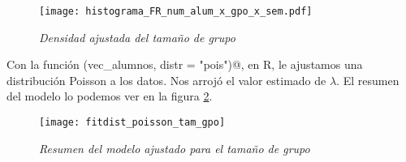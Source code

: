 \begin{figure}[H]
\centering
\texttt{[image: histograma\_FR\_num\_alum\_x\_gpo\_x\_sem.pdf]} %
\caption{\textit{Densidad ajustada del tamaño de grupo}}\label{densidad_tamGpo}
\end{figure}

Con la función \verb@fitdist(vec_alumnos, distr = "pois")@, en R, le ajustamos una distribución Poisson a los datos. Nos arrojó el valor estimado de $\lambda$. El resumen del modelo lo podemos ver en la figura \ref{fitdistPois_tamGpo}.

\begin{figure}[H]
\centering
\texttt{[image: fitdist\_poisson\_tam\_gpo]} %
\caption{\textit{Resumen del modelo ajustado para el tamaño de grupo}}\label{fitdistPois_tamGpo}
\end{figure}
